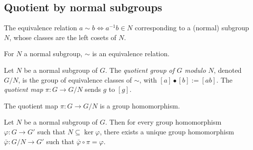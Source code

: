 \subsection{Quotient by normal subgroups}
\label{subsec:groups:quotient-by-normal-subgroups}

\begin{definition}
  \label{def:groups:coset-rel}
  \leanok
  The equivalence relation $a \sim b \iff a^{-1}b \in N$ corresponding
  to a (normal) subgroup $N$, whose classes are the left cosets of
  $N$.
\end{definition}

\begin{proposition}
  \label{prop:groups:equivalence-coset-rel}
  For $N$ a normal subgroup, $\sim$ is an equivalence relation.
\end{proposition}

\begin{definition}
  \label{def:groups:quotient-group-modulo-n}
  \leanok
  Let $N$ be a normal subgroup of $G$. The \emph{quotient group of $G$
  modulo $N$}, denoted $G/N$, is the group of equivalence classes of
  $\sim$, with $[a] \bullet [b] := [ab]$. The \emph{quotient map}
  $\pi : G \to G/N$ sends $g$ to $[g]$.
\end{definition}

\begin{proposition}
  \label{prop:groups:isGroupHom-quotientMap}
  The quotient map $\pi : G \to G/N$ is a group homomorphism.
\end{proposition}

\begin{theorem}
  \label{thm:groups:quotient-universal-property}
  Let $N$ be a normal subgroup of $G$. Then for every group
  homomorphism $\varphi : G \to G'$ such that $N \subseteq
  \ker\varphi$, there exists a unique group homomorphism $\bar\varphi
  : G/N \to G'$ such that $\bar\varphi \circ \pi = \varphi$.
\end{theorem}

